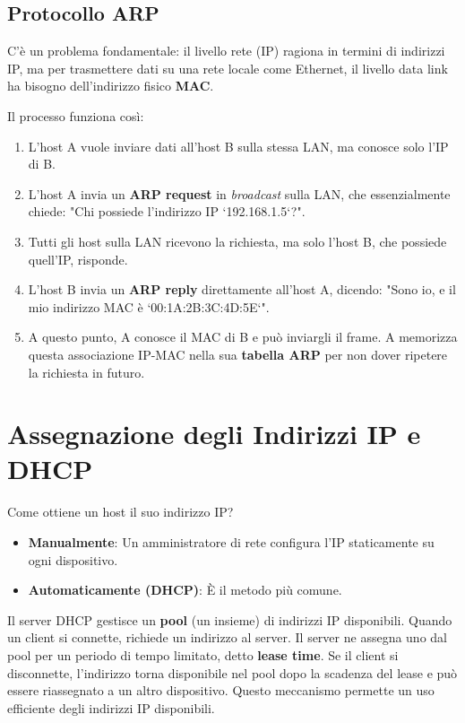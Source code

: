 \subsection{Protocollo ARP}
C'è un problema fondamentale: il livello rete (IP) ragiona in termini di indirizzi IP, ma per trasmettere dati su una rete locale come Ethernet, il livello data link ha bisogno dell'indirizzo fisico \textbf{MAC}.

Il processo funziona così:
\begin{enumerate}
    \item L'host A vuole inviare dati all'host B sulla stessa LAN, ma conosce solo l'IP di B.
    \item L'host A invia un \textbf{ARP request} in \textit{broadcast} sulla LAN, che essenzialmente chiede: "Chi possiede l'indirizzo IP `192.168.1.5`?".
    \item Tutti gli host sulla LAN ricevono la richiesta, ma solo l'host B, che possiede quell'IP, risponde.
    \item L'host B invia un \textbf{ARP reply} direttamente all'host A, dicendo: "Sono io, e il mio indirizzo MAC è `00:1A:2B:3C:4D:5E`".
    \item A questo punto, A conosce il MAC di B e può inviargli il frame. A memorizza questa associazione IP-MAC nella sua \textbf{tabella ARP} per non dover ripetere la richiesta in futuro.
\end{enumerate}

\section{Assegnazione degli Indirizzi IP e DHCP}
Come ottiene un host il suo indirizzo IP?
\begin{itemize}
    \item \textbf{Manualmente}: Un amministratore di rete configura l'IP staticamente su ogni dispositivo.
    \item \textbf{Automaticamente (DHCP)}: È il metodo più comune.
\end{itemize}

Il server DHCP gestisce un \textbf{pool} (un insieme) di indirizzi IP disponibili. Quando un client si connette, richiede un indirizzo al server. Il server ne assegna uno dal pool per un periodo di tempo limitato, detto \textbf{lease time}. Se il client si disconnette, l'indirizzo torna disponibile nel pool dopo la scadenza del lease e può essere riassegnato a un altro dispositivo. Questo meccanismo permette un uso efficiente degli indirizzi IP disponibili.

